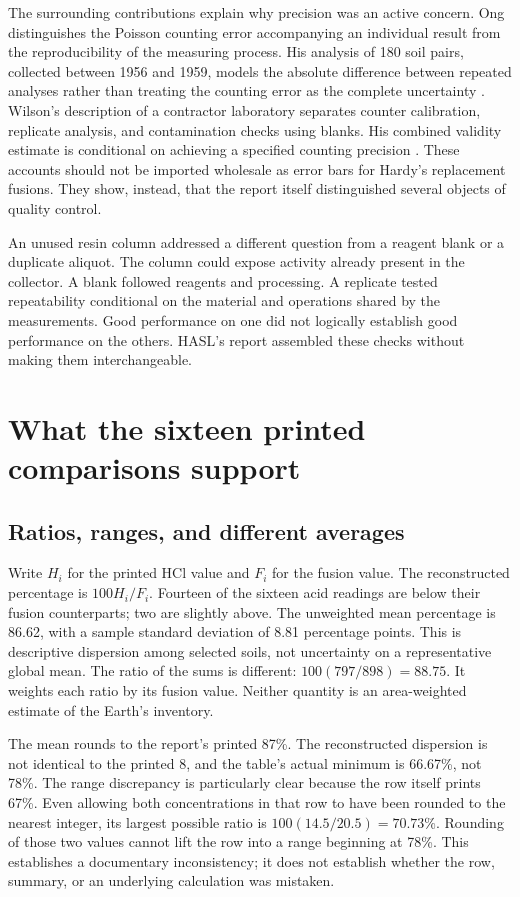 \documentclass[11pt,a4paper]{article}
\begin{document}
The surrounding contributions explain why precision was an active concern. Ong distinguishes the Poisson counting error accompanying an individual result from the reproducibility of the measuring process. His analysis of 180 soil pairs, collected between 1956 and 1959, models the absolute difference between repeated analyses rather than treating the counting error as the complete uncertainty \citep[pp.~75--76]{ong1961}. Wilson's description of a contractor laboratory separates counter calibration, replicate analysis, and contamination checks using blanks. His combined validity estimate is conditional on achieving a specified counting precision \citep[pp.~81--82]{wilson1961}. These accounts should not be imported wholesale as error bars for Hardy's replacement fusions. They show, instead, that the report itself distinguished several objects of quality control.

An unused resin column addressed a different question from a reagent blank or a duplicate aliquot. The column could expose activity already present in the collector. A blank followed reagents and processing. A replicate tested repeatability conditional on the material and operations shared by the measurements. Good performance on one did not logically establish good performance on the others. HASL's report assembled these checks without making them interchangeable.

\section{What the sixteen printed comparisons support}
\subsection{Ratios, ranges, and different averages}
Write $H_i$ for the printed HCl value and $F_i$ for the fusion value. The reconstructed percentage is $100H_i/F_i$. Fourteen of the sixteen acid readings are below their fusion counterparts; two are slightly above. The unweighted mean percentage is 86.62, with a sample standard deviation of 8.81 percentage points. This is descriptive dispersion among selected soils, not uncertainty on a representative global mean. The ratio of the sums is different: $100(797/898)=88.75$. It weights each ratio by its fusion value. Neither quantity is an area-weighted estimate of the Earth's inventory.

The mean rounds to the report's printed 87\%. The reconstructed dispersion is not identical to the printed 8, and the table's actual minimum is 66.67\%, not 78\%. The range discrepancy is particularly clear because the row itself prints 67\%. Even allowing both concentrations in that row to have been rounded to the nearest integer, its largest possible ratio is $100(14.5/20.5)=70.73\%$. Rounding of those two values cannot lift the row into a range beginning at 78\%. This establishes a documentary inconsistency; it does not establish whether the row, summary, or an underlying calculation was mistaken.
\end{document}
